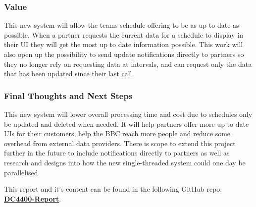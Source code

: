 \subsubsection*{Value}
This new system will allow the teams schedule offering to be as up to date as possible. When a partner requests the current data for a schedule to display in 
their UI they will get the most up to date information possible. This work will also open up the possibility to send update notifications directly to partners
so they no longer rely on requesting data at intervals, and can request only the data that has been updated since their last call.

\subsubsection*{Final Thoughts and Next Steps}
This new system will lower overall processing time and cost due to schedules only be updated and deleted when needed. It will help partners offer more up to 
date UIs for their customers, help the BBC reach more people and reduce some overhead from external data providers. There is scope to extend this project 
further in the future to include notifications directly to partners as well as research and designs into how the new single-threaded system could one day 
be parallelised.

\vspace{0.2cm}
\noindent This report and it's content can be found in the following GitHub repo: \href{https://github.com/OMBowkerBBC/DC4400-Report}{\textbf{DC4400-Report}}.

\newpage
